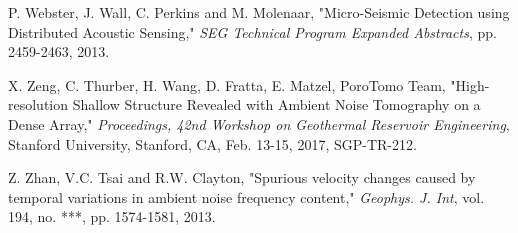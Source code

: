\documentclass[11pt]{article}
\begin{document}
\begin{thebibliography}{30}
 P. Webster, J. Wall, C. Perkins and M. Molenaar, "Micro-Seismic Detection using Distributed Acoustic Sensing," \textit{SEG Technical Program Expanded Abstracts}, pp. 2459-2463, 2013.

 X. Zeng, C. Thurber, H. Wang, D. Fratta, E. Matzel, PoroTomo Team, "High-resolution Shallow Structure Revealed with Ambient Noise Tomography on a Dense Array," \textit{Proceedings, 42nd Workshop on Geothermal Reservoir Engineering}, Stanford University, Stanford, CA, Feb. 13-15, 2017, SGP-TR-212.

 Z. Zhan, V.C. Tsai and R.W. Clayton, "Spurious velocity changes caused by temporal variations in ambient noise frequency content," \textit{Geophys. J. Int}, vol. 194, no. ***, pp. 1574-1581, 2013.

\end{thebibliography}
\end{document}
